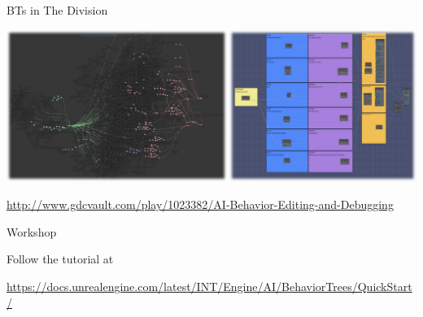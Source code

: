 \begin{frame}{BTs in The Division}
	\begin{center}
		\includegraphics[width=\textwidth]{the_division}
		
		\url{http://www.gdcvault.com/play/1023382/AI-Behavior-Editing-and-Debugging}
	\end{center}
\end{frame}

\begin{frame}{Workshop}
	\begin{center}
		Follow the tutorial at
		
		\url{https://docs.unrealengine.com/latest/INT/Engine/AI/BehaviorTrees/QuickStart/}
	\end{center}
\end{frame}
